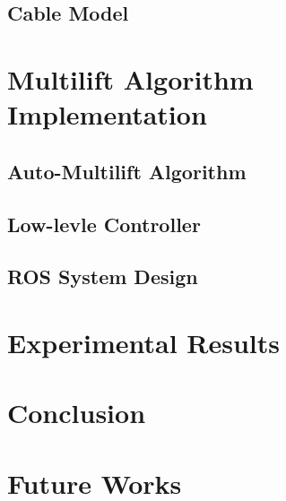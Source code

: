 \documentclass[12pt,twoside,letterpaper]{article}
\begin{document}
\subsection{Cable Model}

\newpage


\section{Multilift Algorithm Implementation}
\subsection{Auto-Multilift Algorithm}
\subsection{Low-levle Controller}
\subsection{ROS System Design}

\newpage
\section{Experimental Results}

\newpage
\section{Conclusion}

\newpage
\section{Future Works}


\newpage
{}


\newpage
\end{document}
